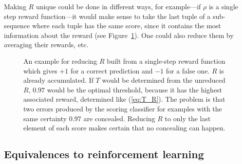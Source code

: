 \documentclass[twoside,11pt]{article}
\begin{document}
Making $R$ unique could be done in different ways, for
example---if $\rho$ is a single step reward function---it
would make sense to take the last tuple of a sub-sequence
where each tuple has the same score, since it contains the
most information about the reward
(see Figure~\ref{fig:reduce}).
One could also reduce them by averaging their rewards, etc.

\begin{figure}
  \begin{center}
  \end{center}
  \caption[An example for reducing $R$.]
          {An example for reducing $R$ built from a
           single-step reward function which gives $+1$ for
           a correct prediction and $-1$ for a false one.
           $R$ is already accumulated.
           If $T$ would be determined from the unreduced
           $R$, $0.97$ would be the optimal threshold,
           because it has the highest associated reward,
           determined like (\ref{eq:T_R}). The problem is
           that two errors produced by the scoring
           classifier for examples with the same
           certainty $0.97$ are concealed. Reducing $R$
           to only the last element of each score makes
           certain that no concealing can happen.}
  \label{fig:reduce}
\end{figure}


\subsection{Equivalences to reinforcement learning}
\label{subsec:rl_vs_ac}
\end{document}
